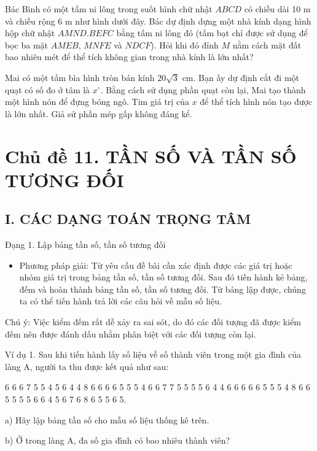 \documentclass[%
    fontsize=12pt,%
    chapterprefix=false,%
    open=right,%
    twoside=false,%
    numbers=noenddot,%
    headings=optiontohead,%
    final,%
    DIV=15,%
    parskip=half %
]{scrbook}
\begin{document}
\begin{tuluan}
\item Bác Bình có một tấm ni lông trong suốt hình chữ nhật $ABCD$ có chiều dài 10 m và chiều rộng 6 m như hình dưới đây. Bác dự định dựng một nhà kính dạng hình hộp chữ nhật $AMND.BEFC$ bằng tấm ni lông đó (tấm bạt chỉ được sử dụng để bọc ba mặt $AMEB$, $MNFE$ và $NDCF$). Hỏi khi đó đỉnh $M$ nằm cách mặt đất bao nhiêu mét để thể tích không gian trong nhà kính là lớn nhất?

\item Mai có một tấm bìa hình tròn bán kính $20\sqrt{3}$ cm. Bạn ấy dự định cắt đi một quạt có số đo ở tâm là $x^\circ$. Bằng cách sử dụng phần quạt còn lại, Mai tạo thành một hình nón để đựng bóng ngô. Tim giá trị của $x$ để thể tích hình nón tạo được là lớn nhất. Giả sử phần mép gấp không đáng kể.

\end{tuluan}

\section{Chủ đề 11. TẦN SỐ VÀ TẦN SỐ TƯƠNG ĐỐI}
\subsection{I. CÁC DẠNG TOÁN TRỌNG TÂM}

Đạng 1. Lập bảng tần số, tần số tương đối

\begin{itemize}
  \item Phương pháp giải: Từ yêu cầu đề bài cần xác định được các giá trị hoặc nhóm giá trị trong bảng tần số, tần số tương đối. Sau đó tiến hành kẻ bảng, đếm và hoàn thành bảng tần số, tần số tương đối. Từ bảng lập được, chúng ta có thể tiến hành trả lời các câu hỏi về mẫu số liệu.
\end{itemize}

Chú ý: Việc kiểm đếm rất dễ xảy ra sai sót, do đó các đối tượng đã được kiểm đếm nên được đánh dấu nhằm phân biệt với các đối tượng còn lại.

Ví dụ 1. Sau khi tiến hành lấy số liệu về số thành viên trong một gia đình của làng A, người ta thu được kết quả như sau:

6 6 6 7 5 5 4 5 6 4 4 8 6 6 6 6 5 5 5 4 6 6 7 7 5 5 5 5 6 4 4 6 6 6 6 6 5 5 5 4 8 6 6 5 5 5 5 6 6 4 5 6 7 6 8 6 5 5 6 5.

a) Hãy lập bảng tần số cho mẫu số liệu thống kê trên.

b) Ở trong làng A, đa số gia đình có bao nhiêu thành viên?
\end{document}
